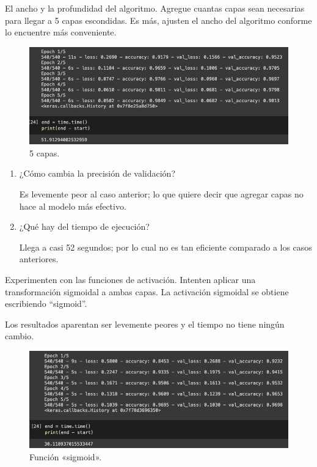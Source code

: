 \begin{problema}
	El ancho y la profundidad del algoritmo.  Agregue cuantas capas sean necesarias para llegar a 5 capas escondidas.  Es más, ajusten el ancho del algoritmo conforme lo encuentre más conveniente. 
		\begin{figure}[H]
		\centering
		\includegraphics[scale=0.5]{Images/4.png}
		\caption{5 capas.}
	\end{figure}
	\begin{enumerate}
		\item ¿Cómo cambia la precisión de validación? 
		\begin{sol}
			Es levemente peor al caso anterior; lo que quiere decir que agregar capas no hace al modelo más efectivo. 
		\end{sol}
		\item ¿Qué hay del tiempo de ejecución?
		\begin{sol}
			Llega a casi 52 segundos; por lo cual no es tan eficiente comparado a los casos anteriores. 
		\end{sol}
	\end{enumerate} 
\end{problema}
\begin{problema}
	Experimenten con las funciones de activación.  Intenten aplicar una transformación sigmoidal a ambas capas.  La activación sigmoidal se obtiene escribiendo “sigmoid”.
	\begin{sol} Los resultados aparentan ser levemente peores y el tiempo no tiene ningún cambio. 
		\begin{figure}[H]
			\centering
			\includegraphics[scale=0.5]{Images/5.png}
			\caption{Función «sigmoid».}
		\end{figure}
	\end{sol}
\end{problema}
